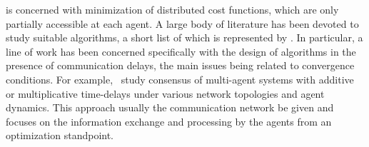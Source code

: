  is concerned
with minimization of distributed cost functions,
which are only partially accessible at each agent.
A large body of literature has been devoted to study suitable algorithms,
a short list of which is represented by
.
In particular, a line of work has been concerned specifically with the design
of algorithms in the presence of communication delays,
the main issues being related to convergence conditions.
For example,~\cite{6120272,6571230,7994706,ZONG2019412,garcia2016periodic}
study consensus of multi-agent systems with additive or multiplicative time-delays
under various network topologies and agent dynamics.
This approach usually the communication network be given
and focuses on the information exchange and processing by the agents
from an optimization standpoint.
